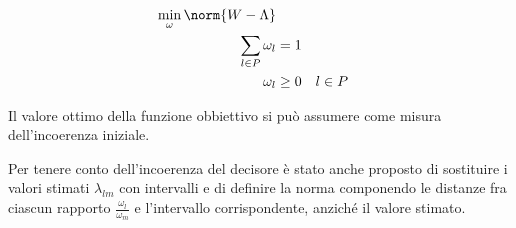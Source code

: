 \documentclass[\main/main.tex]{subfiles}
\begin{document}
\begin{align*}
  \min_\omega \norm{W - \Lambda}                 \\
  \sum_{l \in P} \omega_l & = 1                  \\
  \omega_l                & \geq 0 \quad l \in P
\end{align*}

Il valore ottimo della funzione obbiettivo si può assumere come misura dell'incoerenza iniziale.

Per tenere conto dell'incoerenza del decisore è stato anche proposto di sostituire i valori stimati $\lambda_{lm}$ con intervalli e di definire la norma componendo le distanze fra ciascun rapporto $\frac{\omega_l}{\omega_m}$ e l'intervallo corrispondente, anziché il valore stimato.
\end{document}
